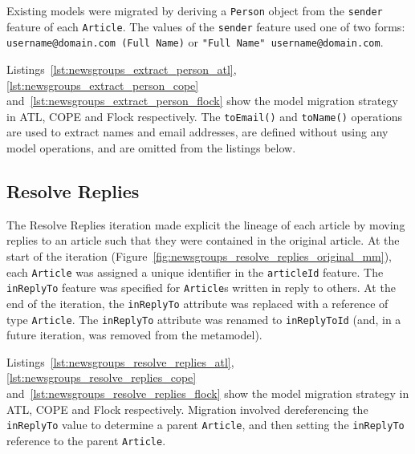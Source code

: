 
Existing models were migrated by deriving a \texttt{Pe\-rs\-on} object from the \texttt{se\-nd\-er} feature of each \texttt{Ar\-ti\-c\-le}. The values of the \texttt{se\-nd\-er} feature used one of two forms: \texttt{username@domain.com (Full Name)} or \texttt{"Full Name" username@domain.com}.

Listings~\ref{lst:newsgroups_extract_person_atl}, \ref{lst:newsgroups_extract_person_cope} and~\ref{lst:newsgroups_extract_person_flock} show the model migration strategy in ATL, COPE and Flock respectively. The \texttt{toEmail()} and \texttt{toName()} operations are used to extract names and email addresses, are defined without using any model operations, and are omitted from the listings below.


\subsection{Resolve Replies}
The Resolve Replies iteration made explicit the lineage of each article by moving replies to an article such that they were contained in the original article. At the start of the iteration (Figure~\ref{fig:newsgroups_resolve_replies_original_mm}), each \texttt{Article} was assigned a unique identifier in the \texttt{articleId} feature. The \texttt{inReplyTo} feature was specified for \texttt{Article}s written in reply to others. At the end of the iteration, the \texttt{inReplyTo} attribute was replaced with a reference of type \texttt{Article}. The \texttt{inReplyTo} attribute was renamed to \texttt{inReplyToId} (and, in a future iteration, was removed from the metamodel).


Listings~\ref{lst:newsgroups_resolve_replies_atl}, \ref{lst:newsgroups_resolve_replies_cope} and~\ref{lst:newsgroups_resolve_replies_flock} show the model migration strategy in ATL, COPE and Flock respectively. Migration involved dereferencing the \texttt{inRe\-p\-lyTo} value to determine a parent \texttt{Article}, and then setting the \texttt{inReplyTo} reference to the parent \texttt{Article}.



